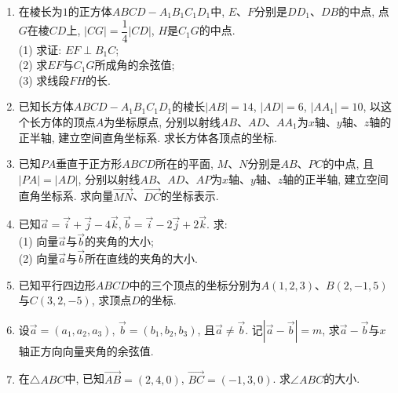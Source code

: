 \documentclass[10pt,a4paper]{article}
\begin{document}
\begin{enumerate}[1.]
\begin{center}
\end{center}
\item 在棱长为$1$的正方体$ABCD-A_1B_1C_1D_1$中, $E$、$F$分别是$DD_1$、$DB$的中点, 点$G$在棱$CD$上, $|CG|=\dfrac 14|CD|$, $H$是$C_1G$的中点.\\
(1) 求证: $EF\perp B_1C$;\\
(2) 求$EF$与$C_1G$所成角的余弦值;\\
(3) 求线段$FH$的长.
\item 已知长方体$ABCD-A_1B_1C_1D_1$的棱长$|AB|=14$, $|AD|=6$, $|AA_1|=10$, 以这个长方体的顶点$A$为坐标原点, 分别以射线$AB$、$AD$、$AA_1$为$x$轴、$y$轴、$z$轴的正半轴, 建立空间直角坐标系. 求长方体各顶点的坐标.
\item 已知$PA$垂直于正方形$ABCD$所在的平面, $M$、$N$分别是$AB$、$PC$的中点, 且$|PA|=|AD|$, 分别以射线$AB$、$AD$、$AP$为$x$轴、$y$轴、$z$轴的正半轴, 建立空间直角坐标系. 求向量$\overrightarrow{MN}$、$\overrightarrow{DC}$的坐标表示.
\item 已知$\overrightarrow a=\overrightarrow i+\overrightarrow j-4\overrightarrow k, \overrightarrow b=\overrightarrow i-2\overrightarrow j+2\overrightarrow k$. 求:\\
(1) 向量$\overrightarrow a$与$\overrightarrow b$的夹角的大小;\\
(2) 向量$\overrightarrow a$与$\overrightarrow b$所在直线的夹角的大小.
\item 已知平行四边形$ABCD$中的三个顶点的坐标分别为$A(1, 2, 3)$、$B(2, -1, 5)$与$C(3, 2, -5)$, 求顶点$D$的坐标.
\item 设$\overrightarrow a=(a_1, a_2, a_3)$, $\overrightarrow b=(b_1, b_2, b_3)$, 且$\overrightarrow a\ne \overrightarrow b$. 记$|\overrightarrow a-\overrightarrow b|=m$, 求$\overrightarrow a-\overrightarrow b$与$x$轴正方向向量夹角的余弦值.
\item 在$\triangle ABC$中, 已知$\overrightarrow{AB}=(2, 4, 0)$, $\overrightarrow{BC}=(-1, 3, 0)$. 求$\angle ABC$的大小.

\end{enumerate}
\end{document}
